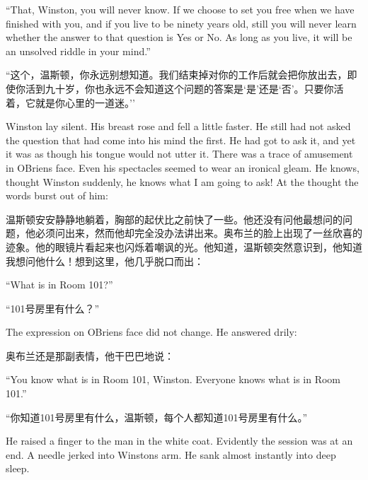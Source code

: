 \begin{paracol}{2}
\switchcolumn*

``That, Winston, you will never know. If we choose to set you free when
we have finished with you, and if you live to be ninety years old, still
you will never learn whether the answer to that question is Yes or No.
As long as you live, it will be an unsolved riddle in your mind.''

\switchcolumn

``这个，温斯顿，你永远别想知道。我们结束掉对你的工作后就会把你放出去，即使你活到九十岁，你也永远不会知道这个问题的答案是`是'还是`否'。只要你活着，它就是你心里的一道迷。''

\switchcolumn*

Winston lay silent. His breast rose and fell a little faster. He still
had not asked the question that had come into his mind the first. He had
got to ask it, and yet it was as though his tongue would not utter it.
There was a trace of amusement in
O\textquotesingle Brien\textquotesingle s face. Even his spectacles
seemed to wear an ironical gleam. He knows, thought Winston suddenly, he
knows what I am going to ask! At the thought the words burst out of him:

\switchcolumn

温斯顿安安静静地躺着，胸部的起伏比之前快了一些。他还没有问他最想问的问题，他必须问出来，然而他却完全没办法讲出来。奥布兰的脸上出现了一丝欣喜的迹象。他的眼镜片看起来也闪烁着嘲讽的光。他知道，温斯顿突然意识到，他知道我想问他什么！想到这里，他几乎脱口而出：

\switchcolumn*

``What is in Room 101?''

\switchcolumn

``101号房里有什么？''

\switchcolumn*

The expression on O\textquotesingle Brien\textquotesingle s face did not
change. He answered drily:

\switchcolumn

奥布兰还是那副表情，他干巴巴地说：

\switchcolumn*

``You know what is in Room 101, Winston. Everyone knows what is in Room
101.''

\switchcolumn

``你知道101号房里有什么，温斯顿，每个人都知道101号房里有什么。''

\switchcolumn*

He raised a finger to the man in the white coat. Evidently the session
was at an end. A needle jerked into Winston\textquotesingle s arm. He
sank almost instantly into deep sleep.


\end{paracol}
